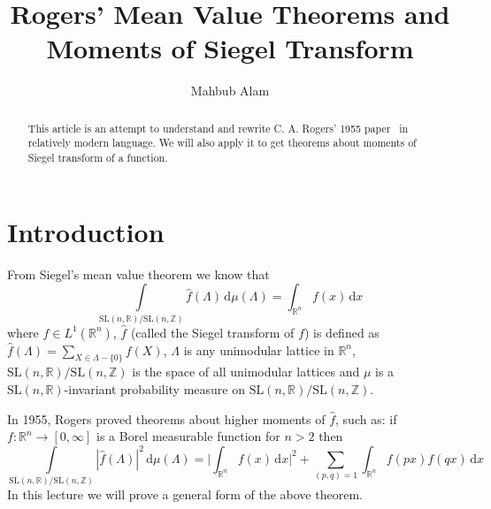 \documentclass[11pt]{article}
\theoremstyle{definition}
\theoremstyle{proof}
\begin{document}
\title{\bfseries Rogers' Mean Value Theorems and Moments of Siegel Transform}

\author{Mahbub Alam}
\date{}

\maketitle

\begin{abstract}
    This article is an attempt to understand and rewrite C. A. Rogers' 1955 paper~\cite{rogers55b} in relatively modern language.
    We will also apply it to get theorems about moments of Siegel transform of a function.
\end{abstract}

\section{Introduction}
From Siegel's mean value theorem we know that
\[
    \int\limits_{\mathrm{SL}(n,\mathbb{R}) / \mathrm{SL}(n,\mathbb{Z})} \widehat{f}(\Lambda  ) \, \mathrm{d} \mu (\Lambda  ) = \int_{\mathbb{R}^n}f(x) \, \mathrm{d} x
\]
where $f\in L^1(\mathbb{R}^n )$, $\widehat{f}$ (called the Siegel transform of $f$) is defined as $\widehat{f}( \Lambda ) = \displaystyle\sum_{X \in \Lambda - \{0\}} f(X)$, $\Lambda$ is any unimodular lattice in $\mathbb{R}^{n}$, $\mathrm{SL}(n, \mathbb{R})/ \mathrm{SL}(n, \mathbb{Z})$ is the space of all unimodular lattices and $\mu$ is a $\mathrm{SL}(n,\mathbb{R})$-invariant probability measure on $\mathrm{SL}(n,\mathbb{R})/\mathrm{SL}(n,\mathbb{Z})$.

In 1955, Rogers proved theorems about higher moments of $\widehat{f}$, such as: if $f : \mathbb{R}^{n} \to [0, \infty]$ is a Borel measurable function for $n > 2$ then
\[
    \int\limits_{\mathrm{SL}(n,\mathbb{R})/\mathrm{SL}(n,\mathbb{Z})} |\widehat{f}(\Lambda )|^2 \, \mathrm{d} \mu(\Lambda ) = \bigg|\int_{\mathbb{R}^{n}}f(x) \, \mathrm{d} x\bigg|^2 + \displaystyle\sum_{(p,q)=1}\int_{\mathbb{R}^{n}}f(px)f(qx) \, \mathrm{d} x
\]
In this lecture we will prove a general form of the above theorem.
\end{document}
